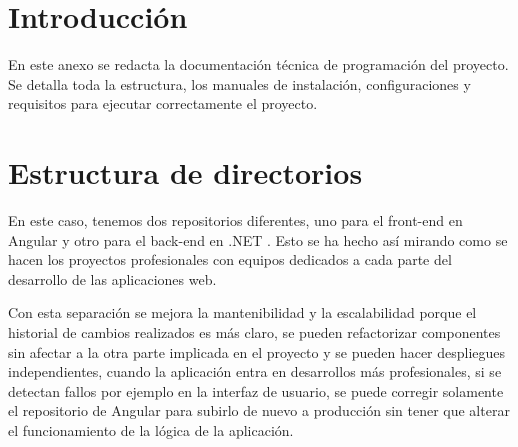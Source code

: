 
\section{Introducción}

En este anexo se redacta la documentación técnica de programación del proyecto. Se detalla toda la estructura, los manuales de instalación, configuraciones y requisitos para ejecutar correctamente el proyecto.

\section{Estructura de directorios}

En este caso, tenemos dos repositorios diferentes, uno para el front-end en Angular \cite{web:repo-front} y otro para el back-end en .NET \cite{web:repo-back}. Esto se ha hecho así mirando como se hacen los proyectos profesionales con equipos dedicados a cada parte del desarrollo de las aplicaciones web.

Con esta separación se mejora la mantenibilidad y la escalabilidad porque el historial de cambios realizados es más claro, se pueden refactorizar componentes sin afectar a la otra parte implicada en el proyecto y se pueden hacer despliegues independientes, cuando la aplicación entra en desarrollos más profesionales, si se detectan fallos por ejemplo en la interfaz de usuario, se puede corregir solamente el repositorio de Angular para subirlo de nuevo a producción sin tener que alterar el funcionamiento de la lógica de la aplicación.

\newpage

